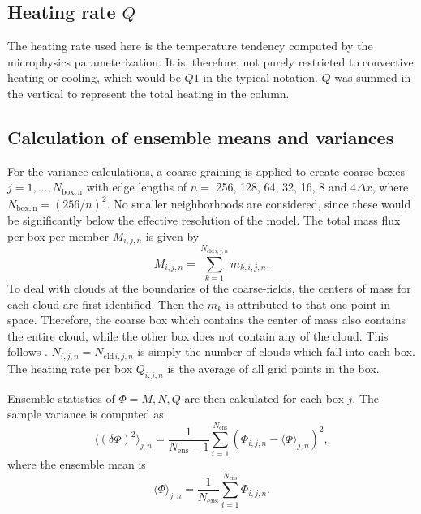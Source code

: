 \documentclass[a4paper, 12pt]{article}
\begin{document}
\subsection{Heating rate $Q$}
The heating rate used here is the temperature tendency computed by the microphysics parameterization. It is, therefore, not purely restricted to convective heating or cooling, which would be $Q1$ in the typical notation. $Q$ was summed in the vertical to represent the total heating in the column.

\subsection{Calculation of ensemble means and variances}
For the variance calculations, a coarse-graining is applied to create coarse boxes $j=1,...,N_{\mathrm{box,n}}$ with edge lengths of $n=$ 256, 128, 64, 32, 16, 8 and 4$\Delta x$, where $N_{\mathrm{box,n}}=(256/n)^2$. No smaller neighborhoods are considered, since these would be significantly below the effective resolution of the model. The total mass flux per box per member $M_{i,j,n}$ is given by
\begin{equation} \label{eq:calc_memM}
 M_{i,j,n} = \sum_{k=1}^{N_{\mathrm{cld}\,i,j,n}} m_{k,i,j,n}.
\end{equation}
To deal with clouds at the boundaries of the coarse-fields, the centers of mass for each cloud are first identified. Then the $m_k$ is attributed to that one point in space. Therefore, the coarse box which contains the center of mass also contains the entire cloud, while the other box does not contain any of the cloud. This follows \cite{Cohen2006}. $N_{i,j,n}=N_{\mathrm{cld}\,i,j,n}$ is simply the number of clouds which fall into each box.  The heating rate per box $Q_{i,j,n}$ is the average of all grid points in the box.

Ensemble statistics of $\Phi = M, N, Q$ are then calculated for each box $j$. The sample variance is computed as
\begin{equation} \label{eq:calc_varM}
 \langle (\delta \Phi )^2 \rangle_{j,n} = \frac{1}{N_{\mathrm{ens}}-1} \sum_{i=1}^{N_{\mathrm{ens}}} (\Phi_{i,j,n} - \langle \Phi \rangle_{j,n})^2,
\end{equation}
where the ensemble mean is
\begin{equation} \label{eq:calc_meanM}
 \langle \Phi \rangle_{j,n} = \frac{1}{N_{\mathrm{ens}}} \sum_{i=1}^{N_{\mathrm{ens}}} \Phi_{i,j,n}.
\end{equation}
\end{document}
